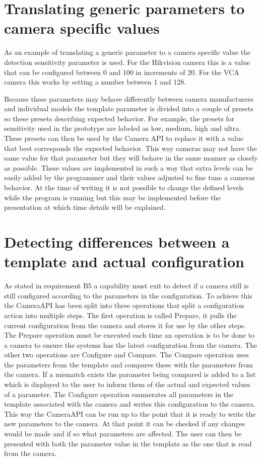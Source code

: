 
\section{Translating generic parameters to camera specific values}
As an example of translating a generic parameter to a camera specific value the detection sensitivity parameter is used.
For the Hikvision camera this is a value that can be configured between 0 and 100 in increments of 20.
For the VCA camera this works by setting a number between 1 and 128.

Because these parameters may behave differently between camera manufacturers and individual models the template parameter is divided into a couple of presets so these presets describing expected behavior.
For example, the presets for sensitivity used in the prototype are labeled as low, medium, high and ultra.
These presets can then be used by the Camera API to replace it with a value that best corresponds the expected behavior.
This way cameras may not have the same value for that parameter but they will behave in the same manner as closely as possible.
These values are implemented in such a way that extra levels can be easily added by the programmer and their values adjusted to fine tune a cameras behavior.
At the time of writing it is not possible to change the defined levels while the program is running but this may be implemented before the presentation at which time details will be explained.

\section{Detecting differences between a template and actual configuration}
As stated in requirement B5 a capability must exit to detect if a camera still is still configured according to the parameters in the configuration.
To achieve this the CameraAPI has been split into three operations that split a configuration action into multiple steps.
The first operation is called Prepare, it pulls the current configuration from the camera and stores it for use by the other steps.
The Prepare operation must be executed each time an operation is to be done to a camera to ensure the systems has the latest configuration from the camera.
The other two operations are Configure and Compare.
The Compare operation uses the parameters from the template and compares these with the parameters from the camera.
If a mismatch exists the parameter being compared is added to a list which is displayed to the user to inform them of the actual and expected values of a parameter.
The Configure operation enumerates all parameters in the template associated with the camera and writes this configuration to the camera.
This way the CameraAPI can be run up to the point that it is ready to write the new parameters to the camera.
At that point it can be checked if any changes would be made and if so what parameters are affected.
The user can then be presented with both the parameter value in the template as the one that is read from the camera.

